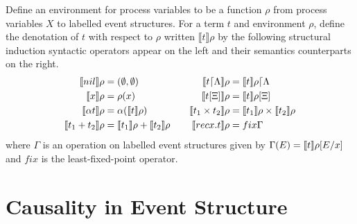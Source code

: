 \documentclass{article}
\begin{document}
\begin{definition}
   Define an environment for process variables to be a function $\rho$ 
   from process variables $X$ to labelled event structures.
   For a term $t$ and environment $\rho$, define the denotation of $t$ with
   respect to $\rho$ written $\llbracket t \rrbracket \rho$ by the following 
   structural induction syntactic operators appear on the left and their 
   semantics counterparts on the right.
    \begin{equation*}
        \begin{aligned}[c]
            \llbracket nil \rrbracket\rho  &= (\emptyset,\emptyset) \\
            \llbracket x \rrbracket\rho  &= \rho(x) \\
            \llbracket \alpha t \rrbracket\rho  &= \alpha(\llbracket t \rrbracket\rho) \\
            \llbracket t_1 + t_2 \rrbracket\rho  &= \llbracket t_1 \rrbracket\rho + \llbracket t_2 \rrbracket\rho \\
        \end{aligned}
        \qquad
        \begin{aligned}[c]
            \llbracket t\lceil \Lambda \rrbracket\rho  &= \llbracket t \rrbracket\rho \lceil \Lambda \\
            \llbracket t[\Xi] \rrbracket\rho  &= \llbracket t \rrbracket\rho[\Xi] \\
            \llbracket t_1 \times t_2 \rrbracket\rho  &= \llbracket t_1 \rrbracket\rho \times \llbracket t_2 \rrbracket\rho \\
            \llbracket recx.t \rrbracket\rho  &= fix\Gamma \\
        \end{aligned}
    \end{equation*}
    where $\Gamma$ is an operation on labelled event structures given by
    $\Gamma(E) = \llbracket t \rrbracket\rho[E / x]$ and $fix$ is the least-fixed-point operator.
\end{definition}

\section{Causality in Event Structure}
\end{document}
